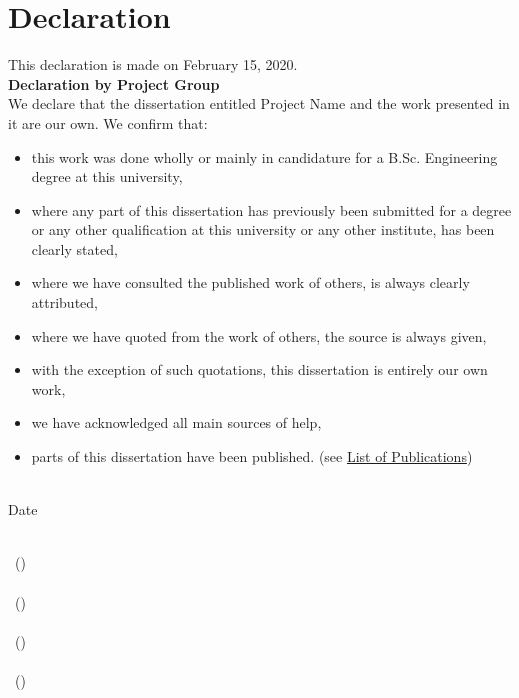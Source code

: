 \chapter*{Declaration}


\begin{flushleft}
	This declaration is made on February 15, 2020. \\
	\vspace{10mm}
	\textbf{Declaration by Project Group} \\
	We declare that the dissertation entitled Project Name and the work presented in it are our own. We confirm that:
	
	\begin{itemize}[noitemsep,topsep=0pt]
		\item this work was done wholly or mainly in candidature for a B.Sc. Engineering degree at this university,
		\item where any part of this dissertation has previously been submitted for a degree or any other qualification at this university or any other institute, has been clearly stated,
		\item where we have consulted the published work of others, is always clearly attributed,
		\item where we have quoted from the work of others, the source is always given,
		\item with the exception of such quotations, this dissertation is entirely our own work,
		\item we have acknowledged all main sources of help,
		\item parts of this dissertation have been published. (see \hyperref[chapter:appendix3]{List of Publications})
	\end{itemize}

\vspace{15mm}
\begin{multicols}{2}
	{\makebox[3cm]{\dotfill}} \\ 
	Date
	\vfill\null
	\columnbreak
	
	{\makebox[7cm]{\dotfill}} \\ 
	\memberA \  (\indexA)  \\
	\vspace{12mm}
	{\makebox[7cm]{\dotfill}} \\ 
	\memberB \ (\indexB)  \\
	\vspace{12mm}
	{\makebox[7cm]{\dotfill}} \\ 
	\memberC \ (\indexC)  \\
	\vspace{12mm}
	{\makebox[7cm]{\dotfill}} \\ 
	\memberD \ (\indexD)  \\

\end{multicols}


\end{flushleft}
